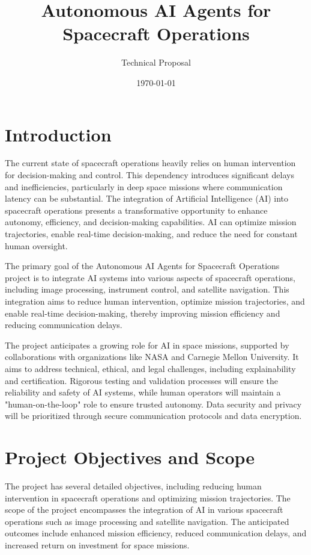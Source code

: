 \documentclass[12pt]{article}
\title{Autonomous AI Agents for Spacecraft Operations}
\author{Technical Proposal}
\date{\today}
\begin{document}
\maketitle

\tableofcontents

\newpage

\section{Introduction}
The current state of spacecraft operations heavily relies on human intervention for decision-making and control. This dependency introduces significant delays and inefficiencies, particularly in deep space missions where communication latency can be substantial. The integration of Artificial Intelligence (AI) into spacecraft operations presents a transformative opportunity to enhance autonomy, efficiency, and decision-making capabilities. AI can optimize mission trajectories, enable real-time decision-making, and reduce the need for constant human oversight.

The primary goal of the Autonomous AI Agents for Spacecraft Operations project is to integrate AI systems into various aspects of spacecraft operations, including image processing, instrument control, and satellite navigation. This integration aims to reduce human intervention, optimize mission trajectories, and enable real-time decision-making, thereby improving mission efficiency and reducing communication delays.

The project anticipates a growing role for AI in space missions, supported by collaborations with organizations like NASA and Carnegie Mellon University. It aims to address technical, ethical, and legal challenges, including explainability and certification. Rigorous testing and validation processes will ensure the reliability and safety of AI systems, while human operators will maintain a "human-on-the-loop" role to ensure trusted autonomy. Data security and privacy will be prioritized through secure communication protocols and data encryption.

\section{Project Objectives and Scope}
The project has several detailed objectives, including reducing human intervention in spacecraft operations and optimizing mission trajectories. The scope of the project encompasses the integration of AI in various spacecraft operations such as image processing and satellite navigation. The anticipated outcomes include enhanced mission efficiency, reduced communication delays, and increased return on investment for space missions.
\end{document}

